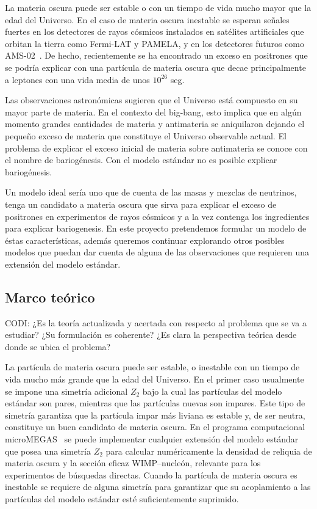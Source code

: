 La materia oscura puede ser estable o con un tiempo de vida mucho
mayor que la edad del Universo. En el caso de materia oscura inestable
se esperan señales fuertes en los detectores de rayos cósmicos
instalados en satélites artificiales que orbitan la tierra como
Fermi-LAT y PAMELA, y en los detectores futuros como
AMS-02~\cite{ams:2009}. De hecho, recientemente se ha encontrado un
exceso en positrones \cite{Adriani:2008zr} que se podría explicar con
una partícula de materia oscura que decae principalmente a leptones
con una vida media de unos $10^{26}$ seg.

Las observaciones astronómicas sugieren que el Universo está compuesto
en su mayor parte de materia. En el contexto del big-bang, esto
implica que en algún momento grandes cantidades de materia y
antimateria se aniquilaron dejando el pequeño exceso de materia que
constituye el Universo observable actual. El problema de explicar el
exceso inicial de materia sobre antimateria se conoce con el nombre de
bariogénesis. Con el modelo estándar no es posible explicar
bariogénesis.

Un modelo ideal sería uno que de cuenta de las masas y mezclas de
neutrinos, tenga un candidato a materia oscura que sirva para explicar
el exceso de positrones en experimentos de rayos cósmicos y a la vez
contenga los ingredientes para explicar bariogenesis. En este proyecto
pretendemos formular un modelo de éstas características, además
queremos continuar explorando otros posibles modelos que puedan dar
cuenta de alguna de las observaciones que requieren una extensión del
modelo estándar.
 

\subsection{Marco teórico}

\begin{instrucciones}
 CODI: ¿Es la teoría actualizada y acertada con respecto al problema que se va a estudiar? ¿Su formulación es coherente? ¿Es clara la perspectiva teórica desde donde se ubica el problema?
\end{instrucciones}

La partícula de materia oscura puede ser estable, o inestable con un
tiempo de vida mucho más grande que la edad del Universo. En el primer
caso usualmente se impone una simetría adicional $Z_2$ bajo la cual
las partículas del modelo estándar son pares, mientras que las
partículas nuevas son impares. Este tipo de simetría garantiza que la
partícula impar más liviana es estable y, de ser neutra, constituye un
buen candidato de materia oscura. En el programa computacional
microMEGAS~\cite{Belanger:2006is} se puede implementar cualquier
extensión del modelo estándar que posea una simetría $Z_2$ para
calcular numéricamente la densidad de reliquia de materia oscura y la
sección eficaz WIMP--nucleón, relevante para los experimentos de
búsquedas directas. Cuando la partícula de materia oscura es inestable
se requiere de alguna simetría para garantizar que su acoplamiento a
las partículas del modelo estándar esté suficientemente suprimido. 

